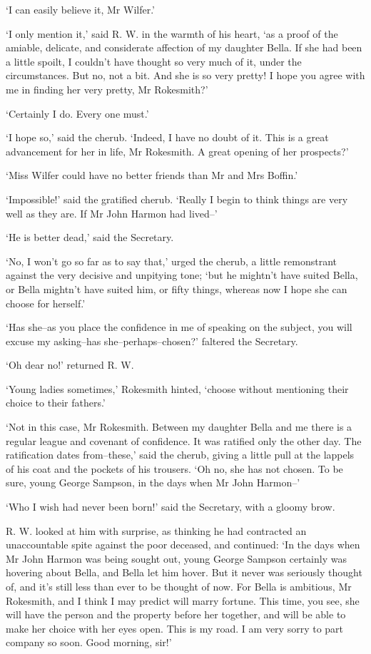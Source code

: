 ‘I can easily believe it, Mr Wilfer.’

‘I only mention it,’ said R. W. in the warmth of his heart, ‘as a proof
of the amiable, delicate, and considerate affection of my daughter
Bella. If she had been a little spoilt, I couldn’t have thought so very
much of it, under the circumstances. But no, not a bit. And she is so
very pretty! I hope you agree with me in finding her very pretty, Mr
Rokesmith?’

‘Certainly I do. Every one must.’

‘I hope so,’ said the cherub. ‘Indeed, I have no doubt of it. This is a
great advancement for her in life, Mr Rokesmith. A great opening of her
prospects?’

‘Miss Wilfer could have no better friends than Mr and Mrs Boffin.’

‘Impossible!’ said the gratified cherub. ‘Really I begin to think things
are very well as they are. If Mr John Harmon had lived--’

‘He is better dead,’ said the Secretary.

‘No, I won’t go so far as to say that,’ urged the cherub, a little
remonstrant against the very decisive and unpitying tone; ‘but he
mightn’t have suited Bella, or Bella mightn’t have suited him, or fifty
things, whereas now I hope she can choose for herself.’

‘Has she--as you place the confidence in me of speaking on the subject,
you will excuse my asking--has she--perhaps--chosen?’ faltered the
Secretary.

‘Oh dear no!’ returned R. W.

‘Young ladies sometimes,’ Rokesmith hinted, ‘choose without mentioning
their choice to their fathers.’

‘Not in this case, Mr Rokesmith. Between my daughter Bella and me there
is a regular league and covenant of confidence. It was ratified only the
other day. The ratification dates from--these,’ said the cherub,
giving a little pull at the lappels of his coat and the pockets of his
trousers. ‘Oh no, she has not chosen. To be sure, young George Sampson,
in the days when Mr John Harmon--’

‘Who I wish had never been born!’ said the Secretary, with a gloomy
brow.

R. W. looked at him with surprise, as thinking he had contracted an
unaccountable spite against the poor deceased, and continued: ‘In the
days when Mr John Harmon was being sought out, young George Sampson
certainly was hovering about Bella, and Bella let him hover. But it
never was seriously thought of, and it’s still less than ever to be
thought of now. For Bella is ambitious, Mr Rokesmith, and I think I may
predict will marry fortune. This time, you see, she will have the person
and the property before her together, and will be able to make her
choice with her eyes open. This is my road. I am very sorry to part
company so soon. Good morning, sir!’


